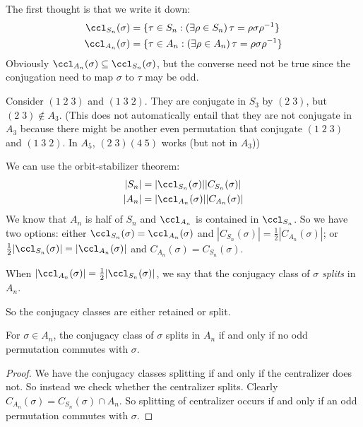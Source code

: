 \documentclass[a4paper]{article}
\begin{document}
The first thought is that we write it down:
\begin{align*}
  \ccl_{S_n}(\sigma) &= \{\tau\in S_n: (\exists \rho \in S_n)\, \tau = \rho\sigma\rho^{-1}\}\\
  \ccl_{A_n}(\sigma) &= \{\tau\in A_n: (\exists \rho \in A_n)\, \tau = \rho\sigma\rho^{-1}\}
\end{align*}
Obviously $\ccl_{A_n}(\sigma)\subseteq \ccl_{S_n}(\sigma)$, but the converse need not be true since the conjugation need to map $\sigma$ to $\tau$ may be odd.

\begin{eg}
  Consider $(1\; 2\; 3)$ and $(1\; 3\; 2)$. They are conjugate in $S_3$ by $(2\; 3)$, but $(2\; 3)\not\in A_3$. (This does not automatically entail that they are not conjugate in $A_3$ because there might be another even permutation that conjugate $(1\; 2\; 3)$ and $(1\; 3\; 2)$. In $A_5$, $(2\; 3)(4\; 5)$ works (but not in $A_3$))
\end{eg}

We can use the orbit-stabilizer theorem:
\begin{align*}
  |S_n| &= |\ccl_{S_n}(\sigma)||C_{S_n}(\sigma)|\\
  |A_n| &= |\ccl_{A_n}(\sigma)||C_{A_n}(\sigma)|
\end{align*}
We know that $A_n$ is half of $S_n$ and $\ccl_{A_n}$ is contained in $\ccl_{S_n}$. So we have two options: either $\ccl_{S_n}(\sigma) = \ccl_{A_n}(\sigma)$ and $|C_{S_n}(\sigma)| = \frac{1}{2}|C_{A_n}(\sigma)|$; or $\frac{1}{2}|\ccl_{S_n}(\sigma)| = |\ccl_{A_n}(\sigma)|$ and $C_{A_n}(\sigma) = C_{S_n}(\sigma)$.

\begin{defi}
  When $|\ccl_{A_n}(\sigma)| = \frac{1}{2}|\ccl_{S_n}(\sigma)|$, we say that the conjugacy class of $\sigma$ \emph{splits} in $A_n$.
\end{defi}

So the conjugacy classes are either retained or split.

\begin{prop}
  For $\sigma\in A_n$, the conjugacy class of $\sigma$ splits in $A_n$ if and only if no odd permutation commutes with $\sigma$.
\end{prop}

\begin{proof}
  We have the conjugacy classes splitting if and only if the centralizer does not. So instead we check whether the centralizer splits. Clearly $C_{A_n}(\sigma) = C_{S_n}(\sigma)\cap A_n$. So splitting of centralizer occurs if and only if an odd permutation commutes with $\sigma$.
\end{proof}
\end{document}
